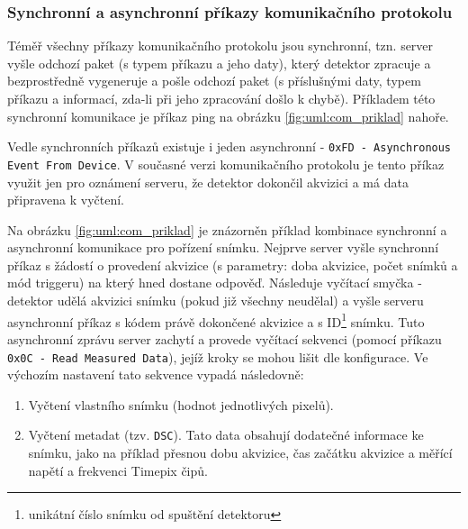 \subsubsection{Synchronní a asynchronní příkazy komunikačního protokolu}\label{atlas:com:synchonni_a_asynchonni_prikazy}
Téměř všechny příkazy komunikačního protokolu jsou synchronní, tzn. server vyšle odchozí paket (s typem příkazu a jeho daty), který detektor zpracuje a bezprostředně vygeneruje a pošle odchozí paket (s příslušnými daty, typem příkazu a informací, zda-li při jeho zpracování došlo k chybě). Příkladem této synchronní komunikace je příkaz ping na obrázku \ref{fig:uml:com_priklad} nahoře.

Vedle synchronních příkazů existuje i jeden asynchronní - \texttt{0xFD - Asynchronous Event From Device}. V současné verzi komunikačního protokolu je tento příkaz využit jen pro oznámení serveru, že detektor dokončil akvizici a má data připravena k vyčtení.

Na obrázku \ref{fig:uml:com_priklad} je znázorněn příklad kombinace synchronní a asynchronní komunikace pro pořízení snímku. Nejprve server vyšle synchronní příkaz s žádostí o provedení akvizice (s parametry: doba akvizice, počet snímků a mód triggeru) na který hned dostane odpověď. Následuje vyčítací smyčka - detektor udělá akvizici snímku (pokud již všechny neudělal) a vyšle serveru asynchronní příkaz s kódem právě dokončené akvizice a s ID\footnote{unikátní číslo snímku od spuštění detektoru} snímku. Tuto asynchronní zprávu server zachytí a provede vyčítací sekvenci (pomocí příkazu \texttt{0x0C - Read Measured Data}), jejíž kroky se mohou lišit dle konfigurace. Ve výchozím nastavení tato sekvence vypadá následovně:
\begin{enumerate}
	\item Vyčtení vlastního snímku (hodnot jednotlivých pixelů).
	\item Vyčtení metadat (tzv. \texttt{DSC}). Tato data obsahují dodatečné informace ke snímku, jako na příklad přesnou dobu akvizice, čas začátku akvizice a měřící napětí a frekvenci Timepix čipů.
\end{enumerate}

